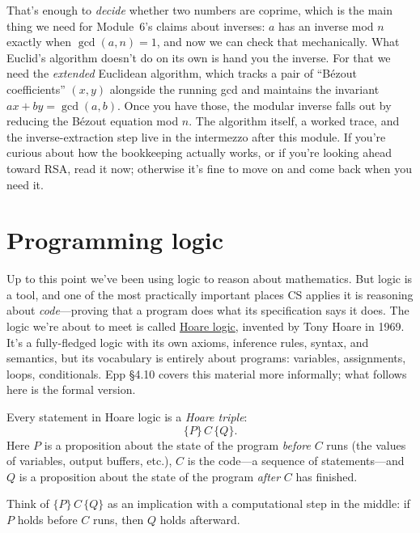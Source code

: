 \documentclass[11pt]{article}
\begin{document}
That's enough to \emph{decide} whether two numbers are coprime, which is the main thing we need for Module~6's claims about inverses: $a$ has an inverse mod $n$ exactly when $\gcd(a,n) = 1$, and now we can check that mechanically. What Euclid's algorithm doesn't do on its own is hand you the inverse. For that we need the \emph{extended} Euclidean algorithm, which tracks a pair of ``B\'ezout coefficients'' $(x, y)$ alongside the running gcd and maintains the invariant $a x + b y = \gcd(a, b)$. Once you have those, the modular inverse falls out by reducing the B\'ezout equation mod $n$. The algorithm itself, a worked trace, and the inverse-extraction step live in the intermezzo after this module. If you're curious about how the bookkeeping actually works, or if you're looking ahead toward RSA, read it now; otherwise it's fine to move on and come back when you need it.


\section{Programming logic}
Up to this point we've been using logic to reason about mathematics. But logic is a tool, and one of the most practically important places CS applies it is reasoning about \emph{code}---proving that a program does what its specification says it does. The logic we're about to meet is called \href{https://en.wikipedia.org/wiki/Hoare_logic}{Hoare logic}, invented by Tony Hoare in 1969. It's a fully-fledged logic with its own axioms, inference rules, syntax, and semantics, but its vocabulary is entirely about programs: variables, assignments, loops, conditionals. Epp §4.10 covers this material more informally; what follows here is the formal version.

Every statement in Hoare logic is a \emph{Hoare triple}:
\[
  \{P\}\, C\, \{Q\}.
\]
Here $P$ is a proposition about the state of the program \emph{before} $C$ runs (the values of variables, output buffers, etc.), $C$ is the code---a sequence of statements---and $Q$ is a proposition about the state of the program \emph{after} $C$ has finished.

Think of $\{P\}\, C\, \{Q\}$ as an implication with a computational step in the middle: if $P$ holds before $C$ runs, then $Q$ holds afterward.
\end{document}
